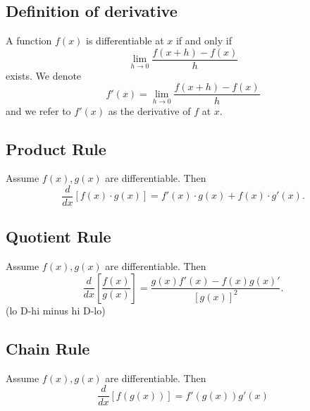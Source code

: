 \documentclass[12pt]{article}
\begin{document}
\subsection{Definition of derivative}

A function $f(x)$ is differentiable at $x$ if and only if 
$$\lim\limits_{ h \to 0} \dfrac{f(x+h)-f(x)}{h}$$
exists. We denote
$$f'(x)=\lim\limits_{ h \to 0} \dfrac{f(x+h)-f(x)}{h}$$
and we refer to $f'(x)$ as the derivative of $f$ at $x$.



\subsection{Product Rule}
Assume $f(x),g(x)$ are differentiable. Then
$$\frac{d}{dx}[f(x)\cdot g(x)]=f'(x)\cdot g(x) + f(x)\cdot g'(x).$$

\subsection{Quotient Rule}
Assume $f(x),g(x)$ are differentiable. Then
$$ \frac{d}{dx}\left[\dfrac{f(x)}{g(x)}\right]=\dfrac{g(x)f'(x)-f(x)g(x)'}{[g(x)]^2}.$$
(lo D-hi minus hi D-lo)

\subsection{Chain Rule}
Assume $f(x),g(x)$ are differentiable. Then 
$$\frac{d}{dx}[f(g(x))]=f'(g(x))g'(x) $$
\end{document}
